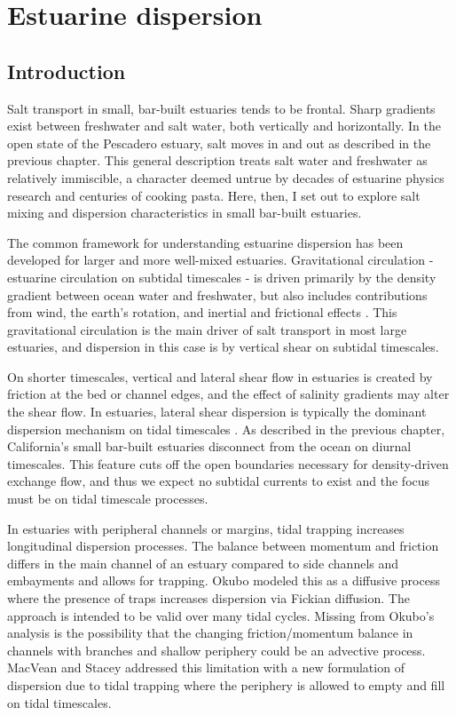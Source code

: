 \chapter{Estuarine dispersion}
\label{chSalt}


\section{Introduction}

Salt transport in small, bar-built estuaries tends to be frontal. Sharp gradients exist between freshwater and salt water, both vertically and horizontally. In the open state of the Pescadero estuary, salt moves in and out as described in the previous chapter. This general description treats salt water and freshwater as relatively immiscible, a character deemed untrue by decades of estuarine physics research and centuries of cooking pasta. Here, then, I set out to explore salt mixing and dispersion characteristics in small bar-built estuaries.


The common framework for understanding estuarine dispersion has been developed for larger and more well-mixed estuaries. Gravitational circulation - estuarine circulation on subtidal timescales - is driven primarily by the density gradient between ocean water and freshwater, but also includes contributions from wind, the earth's rotation, and inertial and frictional effects \parencite{fischer_mixing_1976}. This gravitational circulation is the main driver of salt transport in most large estuaries, and dispersion in this case is by vertical shear on subtidal timescales. 

On shorter timescales, vertical and lateral shear flow in estuaries is created by friction at the bed or channel edges, and the effect of salinity gradients may alter the shear flow. In estuaries, lateral shear dispersion is typically the dominant dispersion mechanism on tidal timescales \parencite{fischer_mixing_1979}. As described in the previous chapter, California's small bar-built estuaries disconnect from the ocean on diurnal timescales. This feature cuts off the open boundaries necessary for density-driven exchange flow, and thus we expect no subtidal currents to exist and the focus must be on tidal timescale processes. 

In estuaries with peripheral channels or margins, tidal trapping increases longitudinal dispersion processes. The balance between momentum and friction differs in the main channel of an estuary compared to side channels and embayments and allows for trapping.  Okubo \parencite*{okubo_effect_1973} modeled this as a diffusive process where the presence of traps increases dispersion via Fickian diffusion. The approach is intended to be valid over many tidal cycles. Missing from Okubo's analysis is the possibility that the changing friction/momentum balance in channels with branches and shallow periphery could be an advective process. MacVean and Stacey \parencite*{macvean_estuarine_2011} addressed this limitation with a new formulation of dispersion due to tidal trapping where the periphery is allowed to empty and fill on tidal timescales.

